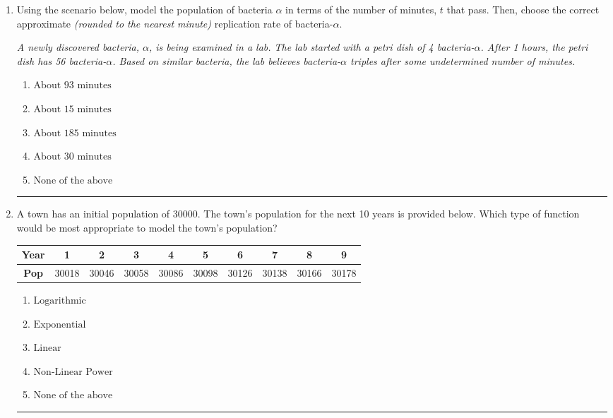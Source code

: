 \documentclass[14pt]{extbook}
\newcommand{\litem}[1]{\item#1\hspace*{-1cm}\rule{\textwidth}{0.4pt}}
\begin{document}
\begin{enumerate}
{\begin{enumerate}[label=\Alph*.]
\end{enumerate} }
\litem{
Using the scenario below, model the population of bacteria $\alpha$ in terms of the number of minutes, $t$ that pass. Then, choose the correct approximate \textit{(rounded to the nearest minute)} replication rate of bacteria-$\alpha$.
\begin{center}
    \textit{ A newly discovered bacteria, $\alpha$, is being examined in a lab. The lab started with a petri dish of 4 bacteria-$\alpha$. After 1 hours, the petri dish has 56 bacteria-$\alpha$. Based on similar bacteria, the lab believes bacteria-$\alpha$ triples after some undetermined number of minutes. }
\end{center}
\begin{enumerate}[label=\Alph*.]
\item \( \text{About } 93 \text{ minutes} \)
\item \( \text{About } 15 \text{ minutes} \)
\item \( \text{About } 185 \text{ minutes} \)
\item \( \text{About } 30 \text{ minutes} \)
\item \( \text{None of the above} \)

\end{enumerate} }
\litem{
A town has an initial population of 30000. The town's population for the next 10 years is provided below. Which type of function would be most appropriate to model the town's population?

\begin{tabular}{c|c|c|c|c|c|c|c|c|c}
\textbf{Year} &1 &2 &3 &4 &5 &6 &7 &8 &9\tabularnewline \hline
\textbf{Pop} &30018 &30046 &30058 &30086 &30098 &30126 &30138 &30166 &30178\end{tabular}\begin{enumerate}[label=\Alph*.]
\item \( \text{Logarithmic} \)
\item \( \text{Exponential} \)
\item \( \text{Linear} \)
\item \( \text{Non-Linear Power} \)
\item \( \text{None of the above} \)


\end{enumerate}}
\end{enumerate}
\end{document}
